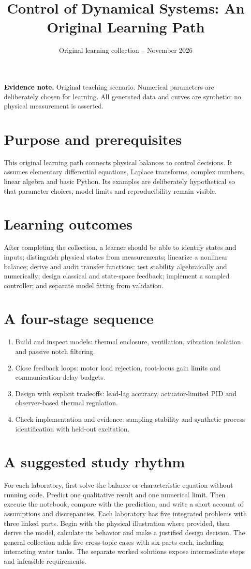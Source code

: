 \documentclass[10pt,a4paper]{article}
\title{\color{ink}Control of Dynamical Systems: An Original Learning Path}
\author{}
\date{Original learning collection -- November 2026}
\begin{document}
\maketitle
\textbf{Evidence note.} Original teaching scenario. Numerical parameters are deliberately chosen for learning. All generated data and curves are synthetic; no physical measurement is asserted.
\section{Purpose and prerequisites}
This original learning path connects physical balances to control decisions. It assumes elementary differential equations, Laplace transforms, complex numbers, linear algebra and basic Python. Its examples are deliberately hypothetical so that parameter choices, model limits and reproducibility remain visible.
\section{Learning outcomes}
After completing the collection, a learner should be able to identify states and inputs; distinguish physical states from measurements; linearize a nonlinear balance; derive and audit transfer functions; test stability algebraically and numerically; design classical and state-space feedback; implement a sampled controller; and separate model fitting from validation.
\section{A four-stage sequence}
\begin{enumerate}
\item Build and inspect models: thermal enclosure, ventilation, vibration isolation and passive notch filtering.
\item Close feedback loops: motor load rejection, root-locus gain limits and communication-delay budgets.
\item Design with explicit tradeoffs: lead-lag accuracy, actuator-limited PID and observer-based thermal regulation.
\item Check implementation and evidence: sampling stability and synthetic process identification with held-out excitation.
\end{enumerate}
\section{A suggested study rhythm}
For each laboratory, first solve the balance or characteristic equation without running code. Predict one qualitative result and one numerical limit. Then execute the notebook, compare with the prediction, and write a short account of assumptions and discrepancies. Each laboratory has five integrated problems with three linked parts. Begin with the physical illustration where provided, then derive the model, calculate its behavior and make a justified design decision. The general collection adds five cross-topic cases with six parts each, including interacting water tanks. The separate worked solutions expose intermediate steps and infeasible requirements.
\newpage
\end{document}
